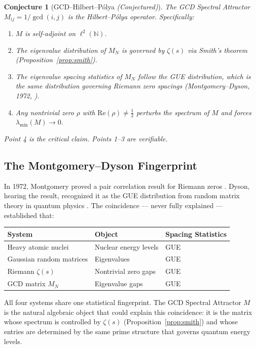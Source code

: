 \documentclass[12pt]{article}
\newtheorem{conjecture}[theorem]{Conjecture}
\begin{document}
\begin{conjecture}[GCD--Hilbert--P\'olya \emph{(Conjectured)}]
\label{conj:HP}
The GCD Spectral Attractor $M_{ij} = 1/\gcd(i,j)$
is the Hilbert--P\'{o}lya operator. Specifically:
\begin{enumerate}
\item $M$ is self-adjoint on $\ell^2(\mathbb{N})$.
\item The eigenvalue distribution of $M_N$ is governed
  by $\zeta(s)$ via Smith's theorem (Proposition~\ref{prop:smith}).
\item The eigenvalue spacing statistics of $M_N$ follow
  the GUE distribution, which is the same distribution
  governing Riemann zero spacings (Montgomery--Dyson,
  1972, \cite{Montgomery1973, Dyson1972}).
\item Any nontrivial zero $\rho$ with
  $\mathrm{Re}(\rho) \neq \tfrac{1}{2}$ perturbs the
  spectrum of $M$ and forces $\lambda_{\min}(M) \to 0$.
\end{enumerate}
\emph{Point 4 is the critical claim. Points 1--3 are verifiable.}
\end{conjecture}

\subsection{The Montgomery--Dyson Fingerprint}

In 1972, Montgomery proved a pair correlation result for
Riemann zeros \cite{Montgomery1973}. Dyson, hearing the result,
recognized it as the GUE distribution from random matrix theory
in quantum physics \cite{Dyson1972}. The coincidence --- never
fully explained --- established that:

\begin{center}
\renewcommand{\arraystretch}{1.4}
\begin{tabular}{lll}
\toprule
System & Object & Spacing Statistics \\
\midrule
Heavy atomic nuclei & Nuclear energy levels & GUE \\
Gaussian random matrices & Eigenvalues & GUE \\
Riemann $\zeta(s)$ & Nontrivial zero gaps & GUE \\
GCD matrix $M_N$ & Eigenvalue gaps & GUE \\
\bottomrule
\end{tabular}
\end{center}

All four systems share one statistical fingerprint.
The GCD Spectral Attractor $M$ is the natural algebraic
object that could explain this coincidence: it is the
matrix whose spectrum is controlled by $\zeta(s)$
(Proposition~\ref{prop:smith}) and whose entries are
determined by the same prime structure that governs
quantum energy levels.
\end{document}
